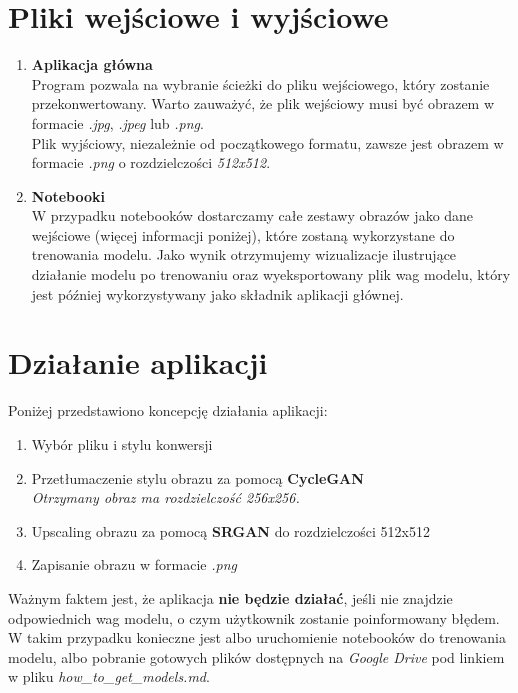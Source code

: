 \documentclass{article}
\begin{document}
\section{Pliki wejściowe i wyjściowe}
\begin{enumerate}[label=\arabic*.]
    \item \textbf{Aplikacja główna} \\
Program pozwala na wybranie ścieżki do pliku wejściowego, który zostanie przekonwertowany. Warto zauważyć, że plik wejściowy musi być obrazem w formacie \textit{.jpg}, \textit{.jpeg} lub \textit{.png}.
\vspace{3mm} \\
Plik wyjściowy, niezależnie od początkowego formatu, zawsze jest obrazem w formacie \textit{.png} o rozdzielczości \textit{512x512}.
    \item \textbf{Notebooki} \\
W przypadku notebooków dostarczamy całe zestawy obrazów jako dane wejściowe (więcej informacji poniżej), które zostaną wykorzystane do trenowania modelu. Jako wynik otrzymujemy wizualizacje ilustrujące działanie modelu po trenowaniu oraz wyeksportowany plik wag modelu, który jest później wykorzystywany jako składnik aplikacji głównej.
\end{enumerate}

\section{Działanie aplikacji}
Poniżej przedstawiono koncepcję działania aplikacji:
\begin{enumerate}[label=\arabic*.]
    \item Wybór pliku i stylu konwersji
    \item Przetłumaczenie stylu obrazu za pomocą \textbf{CycleGAN} \\ \textit{Otrzymany obraz ma rozdzielczość 256x256.}
    \item Upscaling obrazu za pomocą \textbf{SRGAN} do rozdzielczości 512x512
    \item Zapisanie obrazu w formacie \textit{.png}
\end{enumerate}
Ważnym faktem jest, że aplikacja \textbf{nie będzie działać}, jeśli nie znajdzie odpowiednich wag modelu, o czym użytkownik zostanie poinformowany błędem.
W takim przypadku konieczne jest albo uruchomienie notebooków do trenowania modelu, albo pobranie gotowych plików dostępnych na \textit{Google Drive} pod linkiem w pliku \textit{how\_to\_get\_models.md}.
\end{document}
